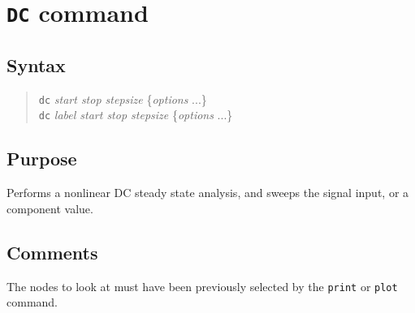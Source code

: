 %
%
%
%
\section{{\tt DC} command}
\subsection{Syntax}
\begin{verse}
{\tt dc} {\it start stop stepsize} \{{\it options} ...\}\\
{\tt dc} {\it label start stop stepsize} \{{\it options} ...\}
\end{verse}
\subsection{Purpose}

Performs a nonlinear DC steady state analysis, and sweeps the signal input,
or a component value.
\subsection{Comments}

The nodes to look at must have been previously selected by the {\tt print} or
{\tt plot} command.

